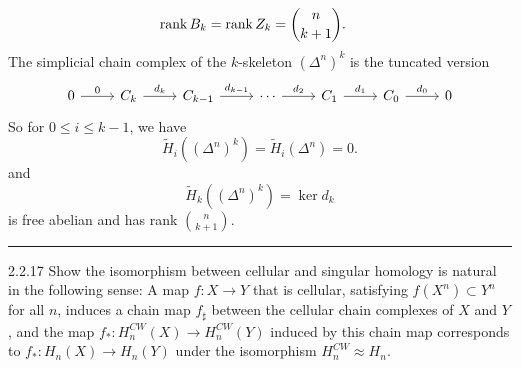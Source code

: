 \documentclass[a4paper, 12pt]{article}
\begin{document}
\begin{solution}
\begin{align*}
    \text{rank}\, B_k&=\text{rank}\, Z_k=\binom{n}{k+1}.
\end{align*}
The simplicial chain complex of the \(k\)-skeleton \((\Delta^n)^k\) is the tuncated version 
\[\begin{tikzcd}
	0 & {C_k} & {C_{k-1}} & \cdots & {C_1} & {C_0} & 0
	\arrow["0", from=1-1, to=1-2]
	\arrow["{d_k}", from=1-2, to=1-3]
	\arrow["{d_{k-1}}", from=1-3, to=1-4]
	\arrow["{d_2}", from=1-4, to=1-5]
	\arrow["{d_1}", from=1-5, to=1-6]
	\arrow["{d_0}", from=1-6, to=1-7]
\end{tikzcd}\]
So for \(0\leq i\leq k-1\), we have 
\[\tilde{H}_i((\Delta^n)^k)=\tilde{H}_i(\Delta^n)=0.\]
and 
\[\tilde{H}_k((\Delta^n)^k)=\ker d_k\]
is free abelian and has rank \(\binom{n}{k+1}\).
\end{solution}

\noindent\rule{7in}{2.8pt}
\begin{problem}{2.2.17}
Show the isomorphism between cellular and singular homology is natural in the following sense: A map \(f:X\rightarrow Y\) that is cellular, satisfying \(f(X^n)\subset Y^n\) for all \(n\), induces a chain 
map \(f_\sharp\) between the cellular chain complexes of \(X\) and \(Y\), and the map \(f_*:H_n^{CW}(X)\rightarrow H_n^{CW}(Y)\) induced by this chain map corresponds to \(f_*:H_n(X)\rightarrow H_n(Y)\) under the 
isomorphism \(H_n^{CW}\approx H_n\).
\end{problem}
\end{document}
